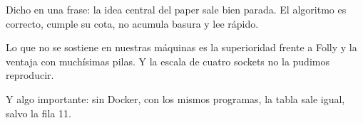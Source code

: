 Dicho en una frase: la idea central del paper sale bien parada. El algoritmo es correcto, cumple su cota, no acumula basura y lee rápido.

Lo que no se sostiene en nuestras máquinas es la superioridad frente a Folly y la ventaja con muchísimas pilas. Y la escala de cuatro sockets no la pudimos reproducir.

Y algo importante: sin Docker, con los mismos programas, la tabla sale igual, salvo la fila 11.
